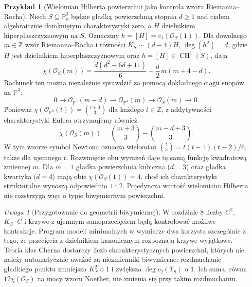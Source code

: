 \documentclass[11pt,a4paper,openany]{report}
\numberwithin{equation}{section}
\theoremstyle{plain}
\theoremstyle{definition}
\newtheorem{przyklad}[twierdzenie]{Przykład}
\theoremstyle{remark}
\newtheorem{uwaga}[twierdzenie]{Uwaga}
\newcommand{\Z}{\mathbb Z}
\newcommand{\PP}{\mathbb P}
\begin{document}
\begin{przyklad}[Wielomian Hilberta powierzchni jako kontrola wzoru Riemanna--Rocha]
\label{prz:ga7-hilbert-polynomial}
Niech $S\subseteq\PP^3_k$ będzie gładką powierzchnią
stopnia $d\ge1$ nad ciałem algebraicznie domkniętym
charakterystyki zero, a $H$ dzielnikiem hiperpłaszczyznowym
na $S$. Oznaczmy $h=[H]=c_1(\mathcal O_S(1))$.
Dla dowolnego $m\in\Z$ wzór Riemanna--Rocha
i równości $K_S\sim(d-4)H$, $\deg(h^2)=d$,
gdzie $H$ jest dzielnikiem hiperpłaszczyznowym
oraz $h=[H]\in\operatorname{CH}^1(S)$, dają
\[
\chi(\mathcal O_S(m))
=\frac{d(d^2-6d+11)}6
 +\frac d2\,m(m+4-d).
\]
Rachunek ten można niezależnie sprawdzić za pomocą
dokładnego ciągu snopów na $\PP^3$:
\[
0\longrightarrow\mathcal O_{\PP^3}(m-d)
\longrightarrow\mathcal O_{\PP^3}(m)
\longrightarrow\mathcal O_S(m)\longrightarrow0.
\]
Ponieważ
$\chi(\mathcal O_{\PP^3}(t))=\binom{t+3}{3}$
dla każdego $t\in\Z$, z addytywności charakterystyki
Eulera otrzymujemy również
\[
\chi(\mathcal O_S(m))
=\binom{m+3}{3}-\binom{m-d+3}{3}.
\]
W tym wzorze symbol Newtona oznacza wielomian
$\binom{t}{3}=t(t-1)(t-2)/6$, także dla ujemnego
$t$. Rozwinięcie obu wyrażeń daje tę samą funkcję
kwadratową zmiennej $m$. Dla $m=1$ gładka
powierzchnia kubiczna ($d=3$) oraz gładka kwartyka
($d=4$) mają obie $\chi(\mathcal O_S(1))=4$,
choć ich charakterystyki strukturalne wynoszą
odpowiednio $1$ i $2$. Pojedyncza wartość
wielomianu Hilberta nie rozstrzyga więc o typie
biwymiernym powierzchni.
\end{przyklad}

\begin{uwaga}[Przygotowanie do geometrii biwymiernej]
W rozdziale 8 liczby $C^2$, $K_S\cdot C$ i krzywe
z ujemnym samoprzecięciem będą kontrolować możliwe
kontrakcje. Program modeli minimalnych w wymiarze dwa
korzysta szczególnie z tego, że przecięcia z dzielnikiem
kanonicznym rozpoznają krzywe wyjątkowe. Teoria
klas Cherna dostarczy liczb charakterystycznych powierzchni,
których nie należy automatycznie uważać za niezmienniki
biwymierne: rozdmuchanie gładkiego punktu zmniejsza $K_S^2$
o $1$ i zwiększa $\deg c_2(T_S)$ o $1$.
Ich suma, równa $12\chi(\mathcal O_S)$ na mocy wzoru Noether,
nie zmienia się przy takim rozdmuchaniu.
\end{uwaga}

\end{document}
